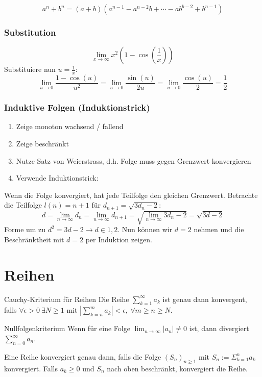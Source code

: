 \documentclass[a4paper,10pt]{article}
\def\limn{\lim_{n\to \infty}}
\def\sumk{\sum_{k=1}^\infty}
\def\sumn{\sum_{n=0}^\infty}
\begin{document}
$$a^n + b^n = (a + b)(a^{n-1} - a^{n-2}b + \cdots - ab^{b-2} + b^{n-1})$$

\subsubsection{Substitution}
$$\lim_{x\to\infty} x^2 (1-\cos(\frac{1}{x}))$$
Substituiere nun $u = \frac{1}{x}$:
$$\lim_{u \to 0} \frac{1 - \cos(u)}{u^2} = \lim_{u \to 0} \frac{\sin(u)}{2u} = \lim_{u\to 0} \frac{\cos(u)}{2} = \frac{1}{2}$$

\subsubsection{Induktive Folgen (Induktionstrick)}
\begin{enumerate}
  \item Zeige monoton wachsend / fallend
  \item Zeige beschränkt
  \item Nutze Satz von Weierstrass, d.h. Folge muss gegen Grenzwert konvergieren
  \item Verwende Induktionstrick:
\end{enumerate}
Wenn die Folge konvergiert, hat jede Teilfolge den gleichen Grenzwert. Betrachte die Teilfolge $l(n) = n + 1$ für $d_{n+1} = \sqrt{3d_n - 2}$:
$$d = \lim_{n\to\infty} d_n = \lim_{n\to\infty} d_{n+1} = \sqrt{\lim_{n \to \infty} 3d_n -2} = \sqrt{3d -2}$$
Forme um zu $ d^2 = 3d -2 \to d \in {1,2}$. Nun können wir $d = 2$ nehmen und die Beschränktheit mit $d=2$ per Induktion zeigen.

\section{Reihen}

\begin{mainbox}{Cauchy-Kriterium für Reihen}
Die Reihe $\sumk a_k$ ist genau dann konvergent, falls $\forall \epsilon > 0 \ \exists N \ge 1$ mit $| \sum_{k=n}^m a_k | < \epsilon, \ \forall m \ge n \ge N$.
\end{mainbox}

\begin{subbox}{Nullfolgenkriterium}
 Wenn für eine Folge $\limn |a_n| \ne 0$ ist, dann divergiert $\sumn a_n$.
\end{subbox}

Eine Reihe konvergiert genau dann, falls die Folge $(S_n)_{n \geq 1}$ mit $S_n := \Sigma_{k=1}^{n} a_k$ konvergiert. Falls $a_k \geq 0$ und $S_n$ nach oben beschränkt, konvergiert die Reihe.\\
\end{document}
